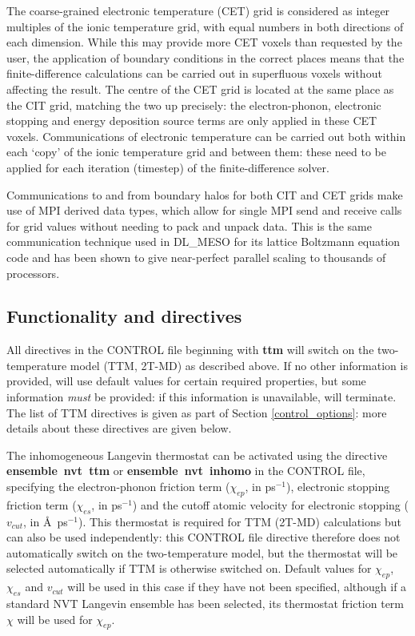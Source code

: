 The coarse-grained electronic temperature (CET) grid is considered as 
integer multiples of the ionic temperature grid, with equal numbers in both 
directions of each dimension. While this may provide more CET voxels than 
requested by the user, the application of boundary conditions in the correct
places means that the finite-difference calculations can be carried out in 
superfluous voxels without affecting the result. The centre of the CET grid is 
located at the same place as the CIT grid, matching the two up precisely: the 
electron-phonon, electronic stopping and energy deposition source terms are 
only applied in these CET voxels. Communications of electronic temperature 
can be carried out both within each `copy' of the ionic temperature grid and 
between them: these need to be applied for each iteration (timestep) of the 
finite-difference solver.

Communications to and from boundary halos for both CIT and CET grids 
make use of MPI derived data types, which allow for single MPI send and 
receive calls for grid values without needing to pack and unpack data. This 
is the same communication technique used in DL\_MESO for its lattice 
Boltzmann equation code\cite{seaton-13a} and has been shown to give 
near-perfect parallel scaling to thousands of processors.

\subsection*{Functionality and directives}

All directives in the CONTROL file beginning with {\bf ttm} will switch on 
the two-temperature model (TTM, 2T-MD) as described above. If no other 
information is provided, \D will use default values for certain required 
properties, but some information {\em must} be provided: if this information 
is unavailable, \D will terminate. The list of TTM directives is given as part of 
Section \ref{control_options}: more details about these directives are given 
below.

The inhomogeneous Langevin thermostat can be activated using the 
directive {\bf ensemble~nvt~ttm} or {\bf ensemble~nvt~inhomo} in the 
CONTROL file, specifying the electron-phonon friction term ($\chi_{ep}$, 
in ps$^{-1}$), electronic stopping friction term ($\chi_{es}$, in ps$^{-1}$) 
and the cutoff atomic velocity for electronic stopping ($v_{cut}$, in 
\AA~ps$^{-1}$). This thermostat is required for TTM (2T-MD) calculations 
but can also be used independently: this CONTROL file directive therefore 
does not automatically switch on the two-temperature model, but the 
thermostat will be selected automatically if TTM is otherwise switched on. 
Default values for $\chi_{ep}$, $\chi_{es}$ and $v_{cut}$ will be used in this 
case if they have not been specified, although if a standard NVT Langevin 
ensemble has been selected, its thermostat friction term $\chi$ will be used 
for $\chi_{ep}$.

